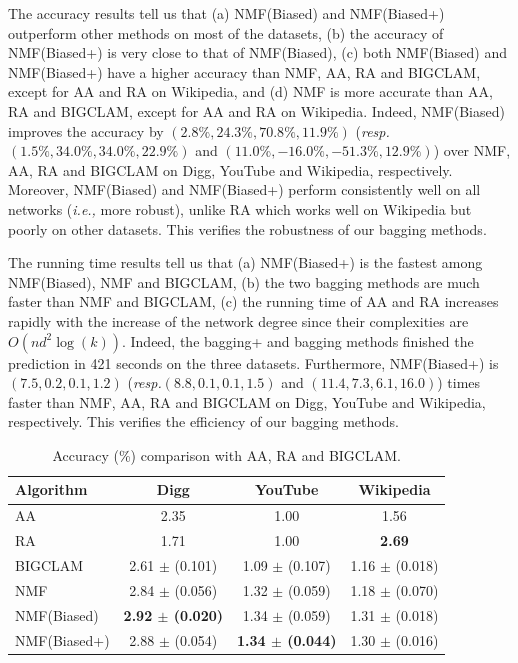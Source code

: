 \documentclass[10pt,journal,compsoc]{IEEEtran}
\newcommand{\NMF}{{\sf NMF}\xspace }
\newcommand{\Biased}{{\sf NMF(Biased)}\xspace}
\newcommand{\Aa}{{\sf AA}\xspace }
\newcommand{\RA}{{\sf RA}\xspace }
\newcommand{\BIGCLAM}{{\sf BIGCLAM}\xspace}
\newcommand{\Digg}{{\sf Digg}\xspace}
\newcommand{\YouTube}{{\sf YouTube}\xspace}
\newcommand{\Wikipedia}{{\sf Wikipedia}\xspace}
\newcommand{\Biasedp}{{\sf NMF(Biased+)}\xspace}
\newcommand{\ie}{\emph{i.e.,}\xspace}
\newcommand{\resp}{\emph{resp.}\xspace}
\begin{document}
The accuracy results tell us that (a) \Biased and \Biasedp outperform other methods on
most of the datasets, (b) the accuracy of \Biasedp is very close to that of \Biased, (c) both
\Biased and \Biasedp have a higher accuracy than \NMF, \Aa, \RA and \BIGCLAM, except for \Aa and \RA on \Wikipedia,
and (d) \NMF is more accurate than \Aa, \RA and \BIGCLAM, except for \Aa and \RA on \Wikipedia.
Indeed, \Biased improves the accuracy by $(2.8\%, 24.3\%, 70.8\%, 11.9\%)$ (\resp $(1.5\%, 34.0\%, 34.0\%, 22.9\%)$
and $(11.0\%, -16.0\%, -51.3\%, 12.9\%)$) over \NMF, \Aa, \RA and \BIGCLAM on \Digg, \YouTube and \Wikipedia,
respectively. Moreover, \Biased and \Biasedp perform consistently well on all networks (\ie more robust), unlike \RA which works well
on \Wikipedia but poorly on other datasets. This verifies the robustness of our bagging methods.


The running time results tell us that (a) \Biasedp is the fastest among
\Biased, \NMF and \BIGCLAM, (b) the two bagging methods are much faster than \NMF and \BIGCLAM,
(c) the running time of \Aa and \RA increases rapidly with the increase of the network degree
 since their complexities are $O(nd^2\log(k))$.
Indeed, the bagging+ and bagging methods finished the prediction in 421 seconds on the three datasets.
Furthermore, \Biasedp is $(7.5, 0.2, 0.1, 1.2)$ (\resp $(8.8, 0.1, 0.1, 1.5)$ and $(11.4, 7.3, 6.1, 16.0)$)
times faster than \NMF, \Aa, \RA and \BIGCLAM on
\Digg, \YouTube and \Wikipedia, respectively.
This verifies the efficiency of our bagging methods.

\begin{table}
\caption{Accuracy (\%) comparison with \Aa, \RA and \BIGCLAM.}
\label{tab_accuracy}
\vspace{-2ex}
\centering
\newcommand{\tabincell}[2]{\begin{tabular}{@{}#1@{}}#2\end{tabular}}
\begin{tabular}{l|c|c|c}
\hline \hline Algorithm  & Digg & YouTube & Wikipedia  \\
\hline \hline
\Aa & 2.35 &	1.00 &	1.56  \\
\RA & 1.71 &	1.00 &	\textbf{2.69}  \\
\BIGCLAM & 2.61 $\pm$ (0.101) &	1.09 $\pm$ (0.107) &	1.16 $\pm$ (0.018)  \\
\NMF & 2.84 $\pm$ (0.056)	& 1.32 $\pm$ (0.059) 	& 1.18 $\pm$ (0.070) \\
\Biased & \textbf{2.92 $\pm$ (0.020)}	& 1.34 $\pm$ (0.059)	& 1.31 $\pm$ (0.018)\\
\Biasedp & 2.88 $\pm$ (0.054)	& \textbf{1.34 $\pm$ (0.044)}	& 1.30 $\pm$ (0.016) \\
\hline \hline
\end{tabular}
\vspace{-2ex}
\end{table}
\end{document}
